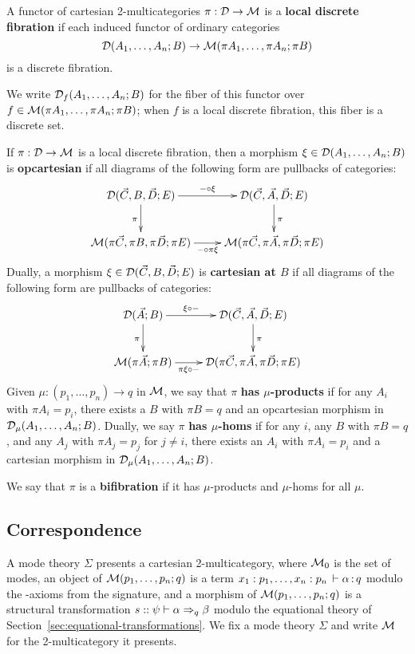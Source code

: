 \begin{definition}
  A functor of cartesian 2-multicategories $\pi:\mathcal{D}\to\mathcal{M}$ is a \textbf{local discrete fibration} if each induced functor of ordinary categories
  \[\mathcal{D}(A_1,\dots,A_n;B)\to\mathcal{M}(\pi A_1,\dots,\pi A_n;\pi B)\]
  is a discrete fibration.
\end{definition}

We write $\mathcal{D}_f(A_1,\dots,A_n;B)$ for the fiber of this functor over
$f\in \mathcal{M}(\pi A_1,\dots,\pi A_n;\pi B)$; when $f$ is a local discrete
fibration, this fiber is a discrete set.

\begin{definition}
  If $\pi:\mathcal{D}\to\mathcal{M}$ is a local discrete fibration, then a morphism $\xi\in\mathcal{D}(A_1,\dots,A_n;B)$ is \textbf{opcartesian} if all diagrams of the following form are pullbacks of categories:
  \[ \xymatrix{
    \D(\vec C,B,\vec D;E) \ar[r]^-{-\circ \xi} \ar[d]_\pi &
    \D(\vec C,\vec A,\vec D;E) \ar[d]^\pi \\
    \M(\pi\vec C,\pi B, \pi\vec D; \pi E) \ar[r]_-{-\circ \pi\xi} &
    \M(\pi\vec C,\pi\vec A,\pi\vec D;\pi E)
  }\]
  Dually, a morphism $\xi\in\mathcal{D}(\vec C,B,\vec D;E)$ is \textbf{cartesian at $B$} if all diagrams of the following form are pullbacks of categories:
  \[ \xymatrix{
    \D(\vec A;B) \ar[r]^-{\xi\circ -} \ar[d]_\pi &
    \D(\vec C,\vec A,\vec D;E) \ar[d]^\pi \\
    \M(\pi\vec A;\pi B) \ar[r]_-{\pi\xi\circ -} &
    \D(\pi\vec C,\pi\vec A,\pi\vec D;\pi E)
  }\]
  Given $\mu:(p_1,\dots,p_n) \to q$ in $\mathcal{M}$, we say that $\pi$ \textbf{has $\mu$-products} if for any $A_i$ with $\pi A_i = p_i$, there exists a $B$ with $\pi B = q$ and an opcartesian morphism in $\mathcal{D}_\mu(A_1,\dots,A_n;B)$.
  Dually, we say $\pi$ \textbf{has $\mu$-homs} if for any $i$, any $B$ with $\pi B = q$, and any $A_j$ with $\pi A_j = p_j$ for $j\neq i$, there exists an $A_i$ with $\pi A_i = p_i$ and a cartesian morphism in $\mathcal{D}_\mu(A_1,\dots,A_n;B)$.

  We say that $\pi$ is a \textbf{bifibration} if it has $\mu$-products
  and $\mu$-homs for all $\mu$.
\end{definition}

\subsection{Correspondence} 

A mode theory $\Sigma$ presents a cartesian 2-multicategory, where
$\mathcal{M}_0$ is the set of modes, an object of $\mathcal{M}(p_1,\ldots,p_n;q)$ is a
term $x_1:p_1,\ldots,x_n:p_n \, \vdash \alpha \, \mathit{:} \, q$ modulo the \deq-axioms
from the signature, and a morphism of $\mathcal{M}(p_1,\ldots,p_n;q)$ is a
structural transformation $s :: \psi \vdash \alpha \Rightarrow_{q} \beta$ modulo
the equational theory of Section~\ref{sec:equational-transformations}.
We fix a mode theory $\Sigma$ and write $\mathcal{M}$ for the 2-multicategory it
presents.

